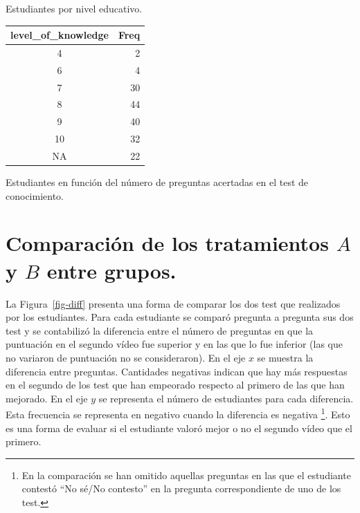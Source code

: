 \documentclass[
  12pt,
  a4paper,
  extrafontsizes,
  onecolumn,
  openright]{memoir}
\begin{document}
\begin{table}
\begin{minipage}[t]{0.50\linewidth}
{Estudiantes por nivel educativo.

}

\end{minipage}%
%
\begin{minipage}[t]{0.50\linewidth}

{\centering 

\hypertarget{tbl-contingencia-4}{}
\begin{longtable}{cr}
\tabularnewline

\toprule
level\_of\_knowledge & Freq \\ 
\midrule
4 & 2 \\ 
6 & 4 \\ 
7 & 30 \\ 
8 & 44 \\ 
9 & 40 \\ 
10 & 32 \\ 
NA & 22 \\ 
\bottomrule
\end{longtable}

Estudiantes en función del número de preguntas acertadas en el test de
conocimiento.

}

\end{minipage}%

\end{table}

\hypertarget{sec-eda-3}{%
\section{\texorpdfstring{Comparación de los tratamientos \(A\) y \(B\)
entre
grupos.}{Comparación de los tratamientos A y B entre grupos.}}\label{sec-eda-3}}

La Figura~\ref{fig-diff} presenta una forma de comparar los dos test que
realizados por los estudiantes. Para cada estudiante se comparó pregunta
a pregunta sus dos test y se contabilizó la diferencia entre el número
de preguntas en que la puntuación en el segundo vídeo fue superior y en
las que lo fue inferior (las que no variaron de puntuación no se
consideraron). En el eje \(x\) se muestra la diferencia entre preguntas.
Cantidades negativas indican que hay más respuestas en el segundo de los
test que han empeorado respecto al primero de las que han mejorado. En
el eje \(y\) se representa el número de estudiantes para cada
diferencia. Esta frecuencia se representa en negativo cuando la
diferencia es negativa \footnote{En la comparación se han omitido
  aquellas preguntas en las que el estudiante contestó \enquote{No sé/No
  contesto} en la pregunta correspondiente de uno de los test.}. Esto es
una forma de evaluar si el estudiante valoró mejor o no el segundo vídeo
que el primero.
\end{document}
